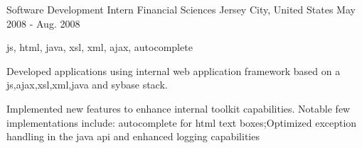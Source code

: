 \cventry
    {Software Development Intern} %
    {Financial Sciences} %
    {Jersey City, United States} %
    {May 2008 - Aug. 2008} %
    {
    \begin{cvitems} %
        \item { js, html, java, xsl, xml, ajax, autocomplete }
        \item { Developed applications using internal web application framework based on a js,ajax,xsl,xml,java and sybase stack. }
        \item { Implemented new features to enhance internal toolkit capabilities. Notable few implementations include: autocomplete for html text boxes;Optimized exception handling in the java api and enhanced logging capabilities }
    \end{cvitems}
    }
